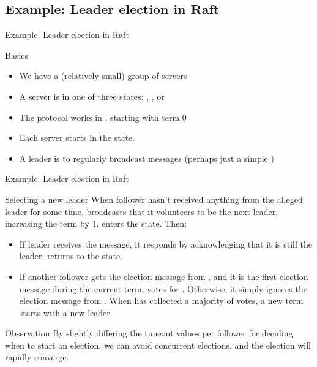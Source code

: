\subsection{Example: Leader election in Raft}
\begin{slide}{Example: Leader election in Raft}
  \begin{block}{Basics}
    \begin{itemize}\firmlist
    \item We have a (relatively small) group of servers
    \item A server is in one of three states: , , or 
    \item The protocol works in , starting with term 0
    \item Each server starts in the  state.
    \item A leader is to regularly broadcast messages (perhaps just a simple )
    \end{itemize}
  \end{block}
\end{slide}
\begin{slide}{Example: Leader election in Raft}
  \begin{block}{Selecting a new leader}
    When follower  hasn't received anything from the alleged leader  for some time, 
    broadcasts that it volunteers to be the next leader, increasing the term by 1.  enters the
     state. Then:
    \begin{itemize}\firmlist
    \item If leader  receives the message, it responds by acknowledging that it is still the
      leader.  returns to the  state.
    \item If another follower  gets the election message from , and it is the first
      election message during the current term,  votes for . Otherwise, it simply ignores
      the election message from . When  has collected a majority of votes, a new term starts
      with a new leader.
    \end{itemize}
  \end{block}

  \onslide
  \begin{alertblock}{Observation}
    By slightly differing the timeout values per follower for deciding when to start an election, we can avoid
    concurrent elections, and the election will rapidly converge.
  \end{alertblock}

\end{slide}
